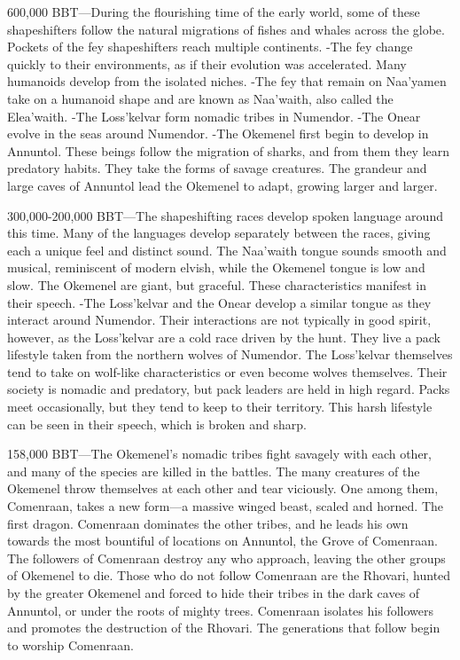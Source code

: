 \documentclass[smalldemyvopaper,11pt,twoside,onecolumn,openright,extrafontsizes]{memoir}
\begin{document}
600,000 BBT—During the flourishing time of the early world, some of these shapeshifters follow the natural migrations of fishes and whales across the globe. Pockets of the fey shapeshifters reach multiple continents.
-The fey change quickly to their environments, as if their evolution was accelerated. Many humanoids develop from the isolated niches.
-The fey that remain on Naa’yamen take on a humanoid shape and are known as Naa'waith, also called the Elea'waith.
-The Loss’kelvar form nomadic tribes in Numendor.
-The Onear evolve in the seas around Numendor.
-The Okemenel first begin to develop in Annuntol. These beings follow the migration of sharks, and from them they learn predatory habits. They take the forms of savage creatures. The grandeur and large caves of Annuntol lead the Okemenel to adapt, growing larger and larger.

300,000-200,000 BBT—The shapeshifting races develop spoken language around this time. Many of the languages develop separately between the races, giving each a unique feel and distinct sound. The Naa’waith tongue sounds smooth and musical, reminiscent of modern elvish, while the Okemenel tongue is low and slow. The Okemenel are giant, but graceful. These characteristics manifest in their speech.
-The Loss’kelvar and the Onear develop a similar tongue as they interact around Numendor. Their interactions are not typically in good spirit, however, as the Loss’kelvar are a cold race driven by the hunt. They live a pack lifestyle taken from the northern wolves of Numendor. The Loss’kelvar themselves tend to take on wolf-like characteristics or even become wolves themselves. Their society is nomadic and predatory, but pack leaders are held in high regard. Packs meet occasionally, but they tend to keep to their territory. This harsh lifestyle can be seen in their speech, which is broken and sharp.

158,000 BBT—The Okemenel’s nomadic tribes fight savagely with each other, and many of the species are killed in the battles. The many creatures of the Okemenel throw themselves at each other and tear viciously. One among them, Comenraan, takes a new form—a massive winged beast, scaled and horned. The first dragon. Comenraan dominates the other tribes, and he leads his own towards the most bountiful of locations on Annuntol, the Grove of Comenraan. The followers of Comenraan destroy any who approach, leaving the other groups of Okemenel to die. Those who do not follow Comenraan are the Rhovari, hunted by the greater Okemenel and forced to hide their tribes in the dark caves of Annuntol, or under the roots of mighty trees. Comenraan isolates his followers and promotes the destruction of the Rhovari. The generations that follow begin to worship Comenraan.
\end{document}
